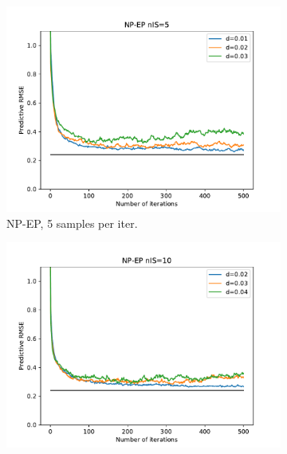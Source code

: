 \newpage
\begin{landscape}
\begin{figure}[ht]
\vspace{-\marginparsep}
\vspace{-\marginparwidth}
\vspace*{1.7cm}
\center
	\begin{subfigure}[b]{0.45\textwidth}
		\includegraphics[width=\textwidth]{figures/snep/rms-npep-nis05}
		\caption{NP-EP, 5 samples per iter.}
		\label{res-npep-5}
	\end{subfigure}
	\begin{subfigure}[b]{0.45\textwidth}
		\includegraphics[width=\textwidth]{figures/snep/rms-npep-nis10}

\end{subfigure}
\end{figure}
\end{landscape}
